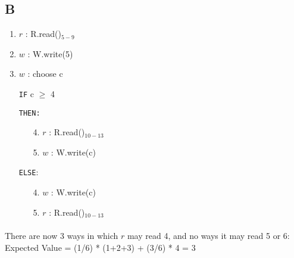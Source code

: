 \documentclass[10pt, letterpaper]{article}
\begin{document}
\subsection{B}
\begin{enumerate}[topsep=0pt,itemsep=-1ex,partopsep=1ex,parsep=1ex]
    \item $r$ : R.read()$_{5-9}$
    \item $w$ : W.write(5)
    \item $w$ : choose c
    \item[\texttt{IF}] c $\geq$ 4 
    \item[\texttt{THEN:}]  
    \begin{enumerate}[topsep=0pt,itemsep=-1ex,partopsep=1ex,parsep=1ex]
        \item[4.] $r$ : R.read()$_{10-13}$
        \item[5.] $w$ : W.write(c)
    \end{enumerate}
    \item[\texttt{ELSE}:]
    \begin{enumerate}[topsep=0pt,itemsep=-1ex,partopsep=1ex,parsep=1ex]
        \item[4.] $w$ : W.write(c)
        \item[5.] $r$ : R.read()$_{10-13}$
    \end{enumerate}
\end{enumerate}
\paragraph{} There are now 3 ways in which $r$ may read 4, and no ways it may read 5 or 6: \\
Expected Value = (1/6) * (1+2+3) + (3/6) * 4 = 3
\end{document}
